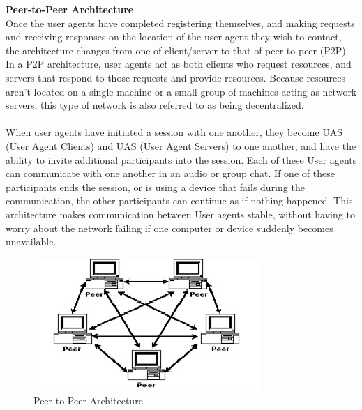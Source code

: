 \documentclass[a4paper]{article}
\begin{document}
\textbf{Peer-to-Peer Architecture\\}
Once the user agents have completed registering themselves, and making requests and receiving responses on the location of the user agent they wish to contact, the architecture changes from one of client/server to that of peer-to-peer (P2P). In a P2P architecture, user agents act as both clients who request resources, and servers that respond to those requests and provide resources. Because resources aren’t located on a single machine or a small group of machines acting as network servers, this type of network is also referred to as being decentralized.\\
\\
When user agents have initiated a session with one another, they become UAS (User Agent Clients) and UAS (User Agent Servers) to one another, and have the ability to invite additional participants into the session. Each of these User agents can communicate with one another in an audio or group chat. If one of these participants ends the session, or is using a device that fails during the communication, the other participants can continue as if nothing happened. This architecture makes communication between User agents stable, without having to worry about the network failing if one computer or device suddenly becomes unavailable.

\begin{center}
\begin{figure}[H]
\includegraphics[width=1\linewidth]{./pictures/peer.JPG}
\caption{\label{fig:Peer-to-Peer Architecture} Peer-to-Peer Architecture}
\end{figure}
\end{center}
\end{document}
